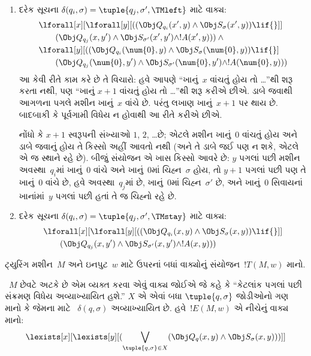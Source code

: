 \begin{enumerate}
\begin{enumerate}
\item {} દરેક સૂચના
  $\delta(q_i, \sigma) =
  \tuple{q_j, \sigma', \TMleft}$ માટે વાક્ય:
\begin{align*}
& \lforall[x][\lforall[y][
    ((\Obj Q_{q_i}(x', y) \land \Obj S_{\sigma}(x', y)) \lif {}]]\\
& \qquad   (\Obj Q_{q_j}(x, y') \land \Obj S_{\sigma'}(x', y') \land
!A(x', y))) \land {}\\
& \lforall[y][((\Obj Q_{q_i}(\num{0}, y) \land \Obj S_{\sigma}(\num{0},
    y)) \lif {}]\\
& \qquad (\Obj Q_{q_j}(\num{0}, y') \land \Obj S_{\sigma'}(\num{0},
  y') \land !A(\num{0}, y)))
\end{align*}
આ કેવી રીતે કામ કરે છે તે વિચારો: હવે આપણે
``ખાનું~$x$ વાંચતું હોય તો \dots''થી શરૂ કરતા નથી,
પણ ``ખાનું $x+1$ વાંચતું હોય તો \dots''થી શરૂ કરીએ
છીએ. ડાબે જવાથી આગળના પગલે મશીન ખાનું~$x$
વાંચે છે. પરંતુ લખાણ ખાનું~$x+1$ પર થાય છે.
બાદબાકી કે પૂર્વગામી વિધેય ન હોવાથી આ રીતે કરીએ
છીએ.

નોંધો કે $x+1$ સ્વરૂપની સંખ્યાઓ $1$, $2$, \dots છે;
એટલે મશીન ખાનું~$0$ વાંચતું હોય અને ડાબે જવાનું હોય
તે કિસ્સો અહીં આવતો નથી (અને તે ડાબે જઈ પણ ન શકે,
એટલે એ જ સ્થાને રહે છે). બીજું સંયોજન એ ખાસ કિસ્સો
આવરે છે: $y$ પગલાં પછી મશીન અવસ્થા~$q_i$માં
ખાનું~$0$ વાંચે અને ખાનું~$0$માં ચિહ્ન~$\sigma$
હોય, તો $y+1$ પગલાં પછી પણ તે ખાનું~$0$ વાંચે છે,
હવે અવસ્થા~$q_j$માં છે, ખાનું~$0$માં ચિહ્ન~$\sigma'$
છે, અને ખાનું~$0$ સિવાયનાં ખાનાંમાં~$y$ પગલાં
પછી હતાં તે જ ચિહ્નો રહે છે.
\item {} દરેક સૂચના
  $\delta(q_i, \sigma) =
  \tuple{q_j, \sigma', \TMstay}$ માટે વાક્ય:
\begin{align*}
& \lforall[x][\lforall[y][(
   (\Obj Q_{q_i}(x, y) \land \Obj S_{\sigma}(x, y)) \lif {}]] \\
&\qquad   (\Obj Q_{q_j}(x, y') \land \Obj S_{\sigma'}(x, y') \land
!A(x, y)))
\end{align*}
\end{enumerate}
\end{enumerate}
ટ્યુરિંગ મશીન~$M$ અને ઇનપુટ~$w$ માટે ઉપરનાં
બધાં વાક્યોનું સંયોજન~$!T(M, w)$ માનો.

~$M$ છેવટે અટકે છે એમ વ્યક્ત કરવા એવું વાક્ય
જોઈએ જે કહે કે ``કેટલાંક પગલાં પછી સંક્રમણ વિધેય
અવ્યાખ્યાયિત હશે.'' $X$ એ એવાં બધા
$\tuple{q, \sigma}$ જોડીઓનો ગણ માનો કે જેમના માટે
~$\delta(q, \sigma)$ અવ્યાખ્યાયિત છે. હવે~$!E(M, w)$
એ નીચેનું વાક્ય માનો:
\[
\lexists[x][\lexists[y][(\bigvee_{\tuple{q, \sigma} \in
      X}(\Obj Q_q(x, y) \land \Obj S_\sigma(x, y)))]]
\]

